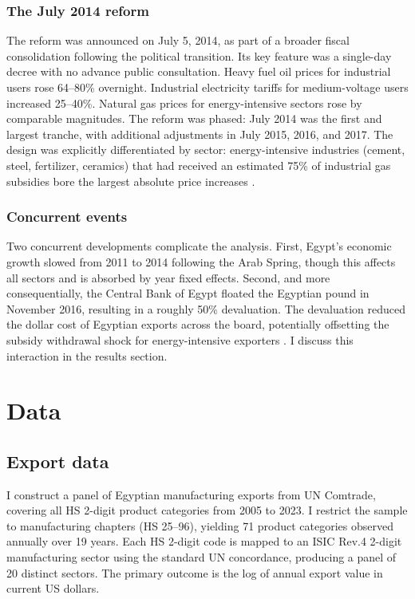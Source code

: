\documentclass[12pt]{article}
\begin{document}
\subsubsection*{The July 2014 reform} The reform was announced on July 5, 2014, as part of a broader fiscal consolidation following the political transition. Its key feature was a single-day decree with no advance public consultation. Heavy fuel oil prices for industrial users rose 64--80\% overnight. Industrial electricity tariffs for medium-voltage users increased 25--40\%. Natural gas prices for energy-intensive sectors rose by comparable magnitudes. The reform was phased: July 2014 was the first and largest tranche, with additional adjustments in July 2015, 2016, and 2017. The design was explicitly differentiated by sector: energy-intensive industries (cement, steel, fertilizer, ceramics) that had received an estimated 75\% of industrial gas subsidies bore the largest absolute price increases \citep{sdralevich2014subsidy}.

\subsubsection*{Concurrent events} Two concurrent developments complicate the analysis. First, Egypt's economic growth slowed from 2011 to 2014 following the Arab Spring, though this affects all sectors and is absorbed by year fixed effects. Second, and more consequentially, the Central Bank of Egypt floated the Egyptian pound in November 2016, resulting in a roughly 50\% devaluation. The devaluation reduced the dollar cost of Egyptian exports across the board, potentially offsetting the subsidy withdrawal shock for energy-intensive exporters \citep{imf2017egypt}. I discuss this interaction in the results section.

\section{Data}

\subsection{Export data}

I construct a panel of Egyptian manufacturing exports from UN Comtrade, covering all HS 2-digit product categories from 2005 to 2023. I restrict the sample to manufacturing chapters (HS 25--96), yielding 71 product categories observed annually over 19 years. Each HS 2-digit code is mapped to an ISIC Rev.4 2-digit manufacturing sector using the standard UN concordance, producing a panel of 20 distinct sectors. The primary outcome is the log of annual export value in current US dollars.
\end{document}
